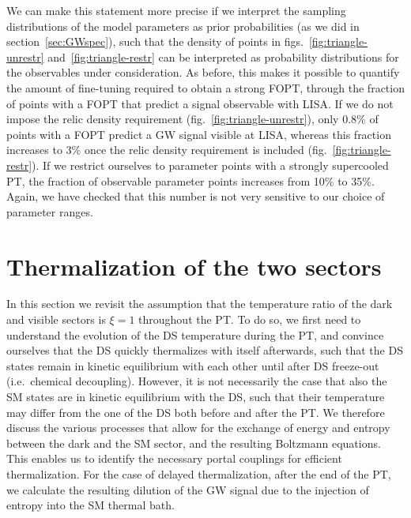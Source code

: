 We can make this statement more precise if we interpret the sampling distributions of the model parameters as prior probabilities (as we did in section~\ref{sec:GWspec}), such that the density of points in figs.~\ref{fig:triangle-unrestr} and~\ref{fig:triangle-restr} can be interpreted as probability distributions for the observables under consideration. As before, this makes it possible to quantify the
amount of fine-tuning required to obtain a strong \ac{FOPT}, through the fraction of points with a \ac{FOPT} that predict a
signal observable with \ac{LISA}. If we do not impose the relic  density requirement (fig.~\ref{fig:triangle-unrestr}), only 0.8\% of points
with a \ac{FOPT} predict a \ac{GW} signal visible at \ac{LISA}, whereas this fraction increases to 3\% once the relic density requirement is included (fig.~\ref{fig:triangle-restr}). If we restrict ourselves to parameter points with a strongly supercooled \ac{PT}, the fraction of observable parameter points increases from 10\% to 35\%. Again, we have checked that this number is not very sensitive to our choice of parameter ranges.



\section{Thermalization of the two sectors}
\label{sec:equilibrium}

In this section we revisit the assumption that the temperature ratio of the dark and visible sectors is $\xi = 1$ throughout the \ac{PT}. To do so, we first need to understand the evolution of the \ac{DS} temperature during the \ac{PT}, and convince ourselves that the
\ac{DS} quickly thermalizes with itself afterwards, such that the \ac{DS} states remain in kinetic equilibrium with each other until after \ac{DS} freeze-out (i.e.~chemical decoupling). However,  it is not necessarily the case that also the \ac{SM} states are in kinetic equilibrium with the \ac{DS}, such that their temperature may differ from the one of the \ac{DS} both before and after the \ac{PT}. We therefore discuss the various processes that allow for the exchange of energy and entropy between the dark and the \ac{SM} sector, and the resulting Boltzmann equations. This enables us to identify the necessary portal couplings for efficient thermalization. For
the case of delayed thermalization, after the end of the \ac{PT}, we calculate the resulting dilution of the \ac{GW} signal due to the injection of entropy into the \ac{SM} thermal bath.

